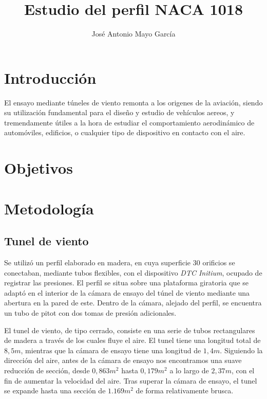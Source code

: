 \documentclass{article}
\title{Estudio del perfil NACA 1018}
\author{José Antonio Mayo García}
\begin{document}
\maketitle

\tableofcontents

\section{Introducción}

El ensayo mediante túneles de viento remonta a los origenes de la aviación, siendo su utilización fundamental para el diseño
y estudio de vehículos aereos, y tremendamente útiles a la hora de estudiar el comportamiento aerodinámico de automóviles,
edificios, o cualquier tipo de dispositivo en contacto con el aire.

\section{Objetivos}

\section{Metodología}

\subsection{Tunel de viento}

Se utilizó un perfil elaborado en madera, en cuya superficie 30 orificios se conectaban, mediante tubos flexibles, 
con el dispositivo \textit{DTC Initium}, ocupado de registrar las presiones. El perfil se situa sobre una plataforma giratoria que se 
adaptó en el interior de la cámara de ensayo del túnel de viento mediante una abertura en la pared de este. Dentro de la cámara,
alejado del perfil, se encuentra un tubo de pitot con dos tomas de presión adicionales.

El tunel de viento, de tipo cerrado, consiste en una serie de tubos rectangulares de madera a través de los cuales fluye el aire.
El tunel tiene una longitud total de $8,5m$, mientras que la cámara de ensayo tiene una longitud de $1,4m$. Siguiendo la dirección
del aire, antes de la cámara de ensayo nos encontramos una suave reducción de sección, desde $0,863m^2$ hasta $0,179m^2$ 
a lo largo de $2,37m$, con el fin de aumentar la velocidad del aire. Tras superar la cámara de ensayo, el tunel se expande
hasta una sección de $1.169m^2$ de forma relativamente brusca. 
\end{document}
